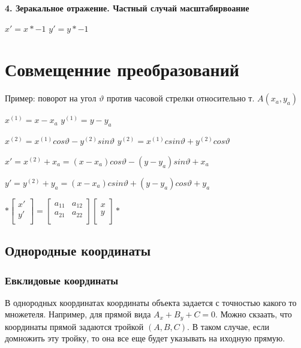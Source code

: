 \documentclass{article}
\begin{document}
\textbf{4. Зеракальное отражение. Частный случай масштабирвоание}

$x' = x*-1$ \hspace{5mm} $y' = y*-1$




\section{Совмещенние преобразований}

Пример: поворот на угол $\vartheta$ против часовой стрелки относительно т. $A(x_a, y_a)$

$x^{(1)}=x-x_a$ \hspace{5mm} $y^{(1)}=y-y_a$ 

$x^{(2)}=x^{(1)} cos \vartheta - y^{(2)} sin \vartheta $ \hspace{5mm}
$y^{(2)}=x^{(1)} csin \vartheta + y^{(2)} cos \vartheta $

\vspace{2mm}

$x' = x^{(2)}+x_a = (x-x_a) cos \vartheta - (y-y_a) sin \vartheta +x_a$

$y' = y^{(2)}+y_a = (x-x_a) csin \vartheta + (y-y_a) cos \vartheta +y_a$


\vspace{5mm}

$*\begin{bmatrix}
    x' \\
    y' \\ 
\end{bmatrix}
=
\begin{bmatrix}
    a_{11} & a_{12}  \\[0.3em]
    a_{21} & a_{22}  \\[0.3em]
\end{bmatrix}
\begin{bmatrix}
    x \\
    y \\
\end{bmatrix}*$

\subsection{Однородные координаты}
    \subsubsection{Евклидовые координаты}

    В однородных координатах координаты объекта задается с точностью какого то множетеля. Например,
    для прямой вида $A_x + B_y + C = 0$. Можно скзаать, что координаты прямой задаются тройкой $(A,B,C)$.
    В таком случае, если домножить эту тройку, то она все еще будет указывать на иходную прямую.
\end{document}
